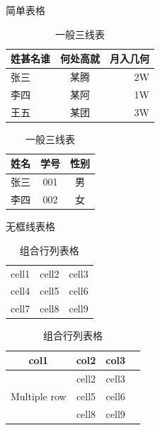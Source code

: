 \begin{table}[ht]
\begin{minipage}[t]{0.45\textwidth}
  \centering
  \caption{简单表格}
  \label{tab:1}
  \begin{tabular}{|l|c|r|}
    \hline
    姓甚名谁 & 何处高就 & 月入几何 \\
    \hline
    张三& 某腾 & 2W \\
    \hline
    李四& 某阿 & 1W \\
    \hline
    王五& 某团 & 3W \\
    \hline
  \end{tabular}
\end{minipage}
\begin{minipage}[t]{0.45\textwidth}
  \centering
  \caption{一般三线表}
  \label{tab:2}
  \begin{tabular}{ccc}
    \hline
    姓名& 学号& 性别\\
    \hline
    张三& 001& 男\\
    李四& 002& 女\\
    \hline
  \end{tabular}
\end{minipage}  
\end{table}

\begin{table}[ht]
\begin{minipage}[t]{0.45\textwidth}
  \centering
  \caption{无框线表格}
  \label{tab:3}
  \begin{tabular}{ c c c }
 cell1 & cell2 & cell3 \\ 
 cell4 & cell5 & cell6 \\  
 cell7 & cell8 & cell9    
\end{tabular}
\end{minipage}
\begin{minipage}[t]{0.45\textwidth}
\centering
\caption{组合行列表格}
\label{tab:4}
\begin{tabular}{ |c|c|c|c| } 
\hline
col1 & col2 & col3 \\
\hline
\multirow{3}{4em}{Multiple row} & cell2 & cell3 \\ 
& cell5 & cell6 \\ 
& cell8 & cell9 \\ 
\hline
\end{tabular}
\end{minipage}  
\end{table}

